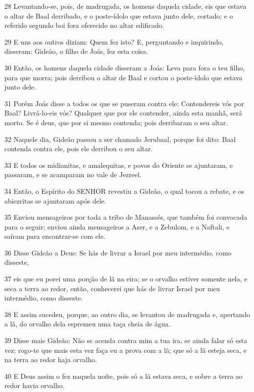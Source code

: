 \par 28 Levantando-se, pois, de madrugada, os homens daquela cidade, eis que estava o altar de Baal derribado, e o poste-ídolo que estava junto dele, cortado; e o referido segundo boi fora oferecido no altar edificado.
\par 29 E uns aos outros diziam: Quem fez isto? E, perguntando e inquirindo, disseram: Gideão, o filho de Joás, fez esta coisa.
\par 30 Então, os homens daquela cidade disseram a Joás: Leva para fora o teu filho, para que morra; pois derribou o altar de Baal e cortou o poste-ídolo que estava junto dele.
\par 31 Porém Joás disse a todos os que se puseram contra ele: Contendereis vós por Baal? Livrá-lo-eis vós? Qualquer que por ele contender, ainda esta manhã, será morto. Se é deus, que por si mesmo contenda; pois derribaram o seu altar.
\par 32 Naquele dia, Gideão passou a ser chamado Jerubaal, porque foi dito: Baal contenda contra ele, pois ele derribou o seu altar.
\par 33 E todos os midianitas, e amalequitas, e povos do Oriente se ajuntaram, e passaram, e se acamparam no vale de Jezreel.
\par 34 Então, o Espírito do SENHOR revestiu a Gideão, o qual tocou a rebate, e os abiezritas se ajuntaram após dele.
\par 35 Enviou mensageiros por toda a tribo de Manassés, que também foi convocada para o seguir; enviou ainda mensageiros a Aser, e a Zebulom, e a Naftali, e saíram para encontrar-se com ele.
\par 36 Disse Gideão a Deus: Se hás de livrar a Israel por meu intermédio, como disseste,
\par 37 eis que eu porei uma porção de lã na eira; se o orvalho estiver somente nela, e seca a terra ao redor, então, conhecerei que hás de livrar Israel por meu intermédio, como disseste.
\par 38 E assim sucedeu, porque, ao outro dia, se levantou de madrugada e, apertando a lã, do orvalho dela espremeu uma taça cheia de água.
\par 39 Disse mais Gideão: Não se acenda contra mim a tua ira, se ainda falar só esta vez; rogo-te que mais esta vez faça eu a prova com a lã; que só a lã esteja seca, e na terra ao redor haja orvalho.
\par 40 E Deus assim o fez naquela noite, pois só a lã estava seca, e sobre a terra ao redor havia orvalho.

